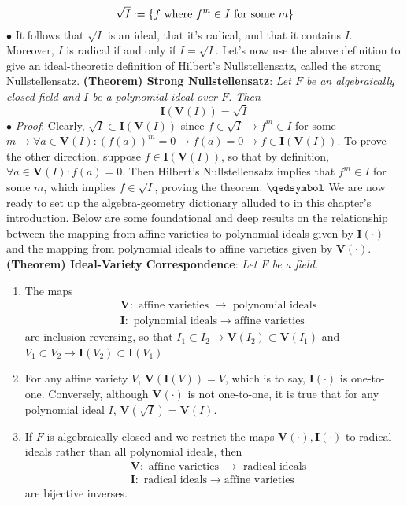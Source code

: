 \documentclass{article}
\newcommand*{\tb}{\textbf}
\newcommand*{\ti}{\textit}
\newcommand*{\nn}{\newline \newline}
\newcommand*{\V}{\ensuremath{\mathbf{V}}}
\newcommand*{\I}{\ensuremath{\mathbf{I}}}
\begin{document}
$$ \sqrt{I} := \{ f \text{ where } f^m \in I \text{ for some $ m $} \} $$
\indent $ \bullet $ It follows that $ \sqrt{I} $ is an ideal, that it's radical, and that it contains $ I $. Moreover, $ I $ is radical if and only if $ I = \sqrt{I} $.
\nn
Let's now use the above definition to give an ideal-theoretic definition of Hilbert's Nullstellensatz, called the strong Nullstellensatz.
\nn
\tb{(Theorem) Strong Nullstellensatz}: \ti{Let $ F $ be an algebraically closed field and $ I $ be a polynomial ideal over $ F $. Then}
$$ \I(\V(I)) = \sqrt{I} $$
\indent $ \bullet $ \ti{Proof}: Clearly, $ \sqrt{I} \subset \I(\V(I)) $ since $ f \in \sqrt{I} \rightarrow f^m \in I $ for some $ m \rightarrow \forall a \in \V(I): (f(a))^m = 0 \rightarrow f(a) = 0 \rightarrow f \in \I(\V(I)) $. To prove the other direction, suppose $ f \in \I(\V(I)) $, so that by definition, $ \forall a \in \V(I): f(a) = 0 $. Then Hilbert's Nullstellensatz implies that $ f^m \in I $ for some $ m $, which implies $ f \in \sqrt{I} $, proving the theorem. $ \qedsymbol $
\nn
We are now ready to set up the algebra-geometry dictionary alluded to in this chapter's introduction. Below are some foundational and deep results on the relationship between the mapping from affine varieties to polynomial ideals given by $ \I(\cdot) $ and the mapping from polynomial ideals to affine varieties given by $ \V(\cdot) $.
\nn
\tb{(Theorem) Ideal-Variety Correspondence}: \ti{Let $ F $ be a field.}
\begin{enumerate}
	\item The maps
		$$ \begin{aligned}
			&\V: \text{ affine varieties } \rightarrow \text{ polynomial ideals} \\
			&\I: \text{ polynomial ideals} \rightarrow \text{affine varieties}
		\end{aligned} $$
are inclusion-reversing, so that $ I_1 \subset I_2 \rightarrow \V(I_2) \subset \V(I_1) $ and $ V_1 \subset V_2 \rightarrow \I(V_2) \subset \I(V_1) $.
	\item For any affine variety $ V $, $ \V(\I(V)) = V $, which is to say, $ \I(\cdot) $ is one-to-one. Conversely, although $ \V(\cdot) $ is not one-to-one, it is true that for any polynomial ideal $ I $, $ \V(\sqrt{I}) = \V(I) $.
	\item If $ F $ is algebraically closed and we restrict the maps $ \V(\cdot), \I(\cdot) $ to radical ideals rather than all polynomial ideals, then
	$$ \begin{aligned}
			&\V: \text{ affine varieties } \rightarrow \text{ radical ideals} \\
			&\I: \text{ radical ideals} \rightarrow \text{affine varieties}
	\end{aligned} $$
	are bijective inverses.
\end{enumerate}
\end{document}
